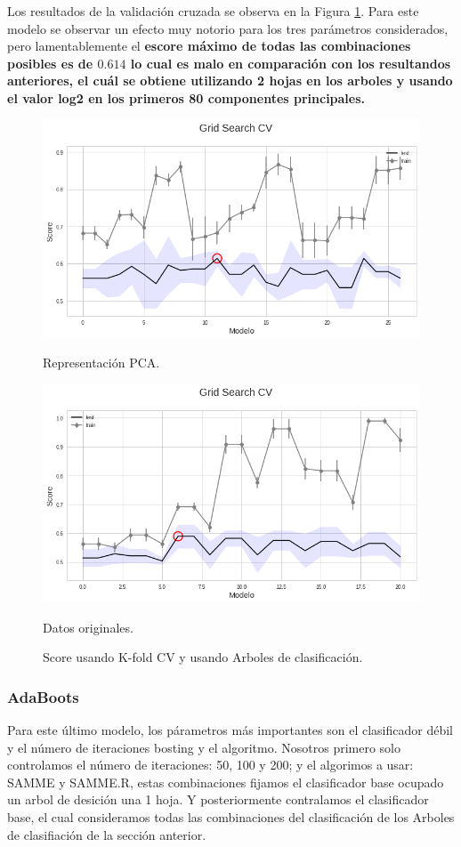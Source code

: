 \documentclass[paper=letter, fontsize=11pt]{scrartcl}
\numberwithin{equation}{section} %
\numberwithin{figure}{section} %
\numberwithin{table}{section} %
\begin{document}
Los resultados de la validación cruzada se observa en la Figura \ref{s_tree}. Para este modelo se observar un efecto muy notorio para los tres parámetros considerados, pero lamentablemente el \textbf{escore máximo de todas las combinaciones posibles es de $0.614$ lo cual es malo en comparación con los resultandos anteriores, el cuál se obtiene utilizando 2 hojas en los arboles y usando el valor log2 en los primeros 80 componentes principales.}

\begin{figure}[!htb]
  \includegraphics[width=\linewidth]{figure/s_tre_pca.png}
  \caption{Representación PCA.}\label{act}
\endminipage\hfill
{}
  \includegraphics[width=\linewidth]{figure/s_tree.png}\caption{Datos originales.}\label{arqui}
\endminipage
\caption{Score usando K-fold CV y usando Arboles de clasificación.}\label{s_tree}
\end{figure}


\subsubsection*{AdaBoots}
Para este último modelo, los párametros más importantes son el clasificador débil y el número de iteraciones bosting y el algoritmo. Nosotros primero solo controlamos el número de iteraciones: 50, 100 y 200; y el algorimos a usar: SAMME y SAMME.R, estas combinaciones fijamos el clasificador base ocupado un arbol de desición una 1 hoja. Y posteriormente contralamos el clasificador base, el cual consideramos todas las combinaciones del clasificación de los Arboles de clasifiación de la sección anterior.\\
\end{document}
